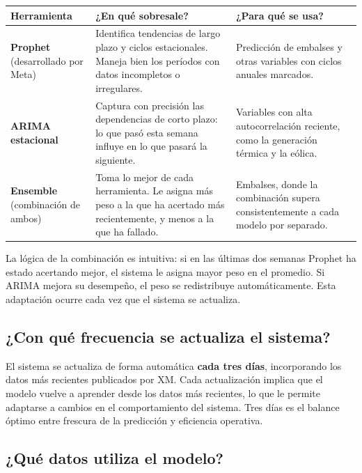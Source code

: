 \documentclass[11pt,a4paper]{article}
\begin{document}
\begin{center}
\small
\begin{tabular}{@{}p{3cm}p{5.8cm}p{5.8cm}@{}}
\toprule
\textbf{Herramienta} & \textbf{¿En qué sobresale?} & \textbf{¿Para qué se usa?} \\
\midrule
\textbf{Prophet} \newline (desarrollado por Meta) &
Identifica tendencias de largo plazo y ciclos estacionales. Maneja bien los períodos con datos incompletos o irregulares. &
Predicción de embalses y otras variables con ciclos anuales marcados. \\
\addlinespace
\textbf{ARIMA estacional} &
Captura con precisión las dependencias de corto plazo: lo que pasó esta semana influye en lo que pasará la siguiente. &
Variables con alta autocorrelación reciente, como la generación térmica y la eólica. \\
\addlinespace
\textbf{Ensemble} \newline (combinación de ambos) &
Toma lo mejor de cada herramienta. Le asigna más peso a la que ha acertado más recientemente, y menos a la que ha fallado. &
Embalses, donde la combinación supera consistentemente a cada modelo por separado. \\
\bottomrule
\end{tabular}
\end{center}

\vspace{2mm}

La lógica de la combinación es intuitiva: si en las últimas dos semanas Prophet ha estado acertando mejor, el sistema le asigna mayor peso en el promedio. Si ARIMA mejora su desempeño, el peso se redistribuye automáticamente. Esta adaptación ocurre cada vez que el sistema se actualiza.

\subsection{¿Con qué frecuencia se actualiza el sistema?}

El sistema se actualiza de forma automática \textbf{cada tres días}, incorporando los datos más recientes publicados por XM. Cada actualización implica que el modelo vuelve a aprender desde los datos más recientes, lo que le permite adaptarse a cambios en el comportamiento del sistema. Tres días es el balance óptimo entre frescura de la predicción y eficiencia operativa.

\subsection{¿Qué datos utiliza el modelo?}
\end{document}
